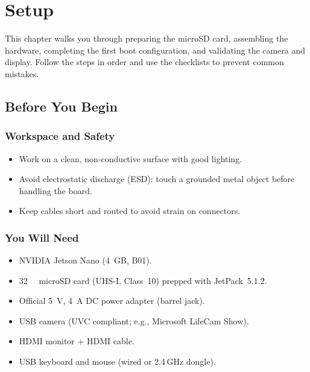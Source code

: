 %
%
%

\chapter{Setup}

This chapter walks you through preparing the microSD card, assembling the hardware, completing the first boot configuration, and validating the camera and display. Follow the steps in order and use the checklists to prevent common mistakes.

\section{Before You Begin}

\subsection*{Workspace and Safety}
\begin{itemize}
	\item Work on a clean, non-conductive surface with good lighting.
	\item Avoid electrostatic discharge (ESD): touch a grounded metal object before handling the board.
	\item Keep cables short and routed to avoid strain on connectors.
\end{itemize}

\subsection*{You Will Need}
\begin{itemize}
	\item NVIDIA Jetson Nano (4~GB, B01).
	\item \SI{32}{\giga\byte} microSD card (UHS-I, Class~10) prepped with JetPack~5.1.2.
	\item Official \SI{5}{\volt}, \SI{4}{\ampere} DC power adapter (barrel jack).
	\item USB camera (UVC compliant; e.g., Microsoft LifeCam Show).
	\item HDMI monitor + HDMI cable.
	\item USB keyboard and mouse (wired or 2.4\,GHz dongle).
\end{itemize}

